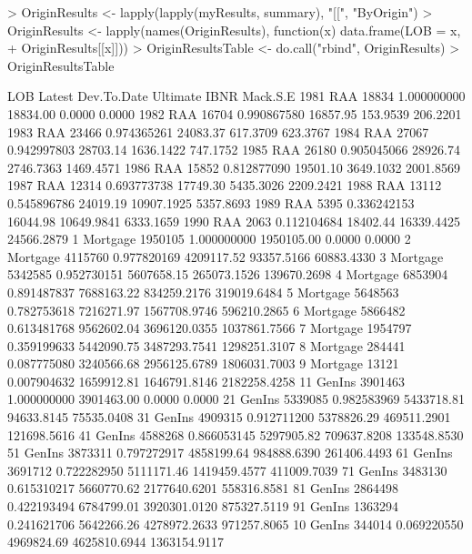 \documentclass[a4paper]{article}
\begin{document}
\begin{Schunk}
\begin{Sinput}
> OriginResults <- lapply(lapply(myResults, summary), "[[", "ByOrigin")
> OriginResults <- lapply(names(OriginResults), function(x) data.frame(LOB = x, 
+     OriginResults[[x]]))
> OriginResultsTable <- do.call("rbind", OriginResults)
> OriginResultsTable
\end{Sinput}
\begin{Soutput}
           LOB  Latest Dev.To.Date   Ultimate         IBNR     Mack.S.E
1981       RAA   18834 1.000000000   18834.00       0.0000       0.0000
1982       RAA   16704 0.990867580   16857.95     153.9539     206.2201
1983       RAA   23466 0.974365261   24083.37     617.3709     623.3767
1984       RAA   27067 0.942997803   28703.14    1636.1422     747.1752
1985       RAA   26180 0.905045066   28926.74    2746.7363    1469.4571
1986       RAA   15852 0.812877090   19501.10    3649.1032    2001.8569
1987       RAA   12314 0.693773738   17749.30    5435.3026    2209.2421
1988       RAA   13112 0.545896786   24019.19   10907.1925    5357.8693
1989       RAA    5395 0.336242153   16044.98   10649.9841    6333.1659
1990       RAA    2063 0.112104684   18402.44   16339.4425   24566.2879
1     Mortgage 1950105 1.000000000 1950105.00       0.0000       0.0000
2     Mortgage 4115760 0.977820169 4209117.52   93357.5166   60883.4330
3     Mortgage 5342585 0.952730151 5607658.15  265073.1526  139670.2698
4     Mortgage 6853904 0.891487837 7688163.22  834259.2176  319019.6484
5     Mortgage 5648563 0.782753618 7216271.97 1567708.9746  596210.2865
6     Mortgage 5866482 0.613481768 9562602.04 3696120.0355 1037861.7566
7     Mortgage 1954797 0.359199633 5442090.75 3487293.7541 1298251.3107
8     Mortgage  284441 0.087775080 3240566.68 2956125.6789 1806031.7003
9     Mortgage   13121 0.007904632 1659912.81 1646791.8146 2182258.4258
11      GenIns 3901463 1.000000000 3901463.00       0.0000       0.0000
21      GenIns 5339085 0.982583969 5433718.81   94633.8145   75535.0408
31      GenIns 4909315 0.912711200 5378826.29  469511.2901  121698.5616
41      GenIns 4588268 0.866053145 5297905.82  709637.8208  133548.8530
51      GenIns 3873311 0.797272917 4858199.64  984888.6390  261406.4493
61      GenIns 3691712 0.722282950 5111171.46 1419459.4577  411009.7039
71      GenIns 3483130 0.615310217 5660770.62 2177640.6201  558316.8581
81      GenIns 2864498 0.422193494 6784799.01 3920301.0120  875327.5119
91      GenIns 1363294 0.241621706 5642266.26 4278972.2633  971257.8065
10      GenIns  344014 0.069220550 4969824.69 4625810.6944 1363154.9117

\end{Soutput}
\end{Schunk}
\end{document}
